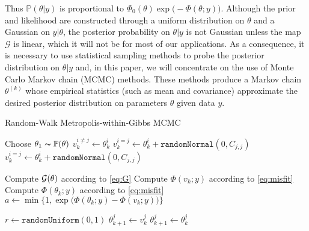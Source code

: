 \documentclass[10pt,letterpaper]{article}
\newcommand{\bbP}{\mathbb{P}}
\begin{document}
Thus $\bbP(\theta|y)$ is proportional to $\Phi_0(\theta)\exp\bigl(-\Phi(\theta;y)\bigr).$
Although the prior and likelihood are constructed through a uniform distribution on
$\theta$ and a Gaussian on $y|\theta$, the posterior probability on $\theta|y$
is not Gaussian unless the map ${\mathcal G}$ is linear, which it will not
be for most of our applications. As a consequence, it is necessary to use
statistical sampling methods to probe the posterior distribution
on $\theta|y$ and, in this paper, we will concentrate on the use of
Monte Carlo Markov chain (MCMC) methods. These methods produce
a Markov chain $\theta^{(k)}$ whose empirical statistics (such as
mean and covariance) approximate the desired posterior distribution
on parameters $\theta$ given data $y$. 

\begin{algorithm}
\caption{Random-Walk Metropolis-within-Gibbs MCMC}
\label{alg:MCMC}
\begin{algorithmic}[1]
	 
		\State Choose $\theta_1 \thicksim \bbP(\theta)$  
		 
			 
				\State $v_k^{i \not= j} \gets \theta_k^i$
				\State $v_k^{i=j} \gets \theta_k^i + \texttt{randomNormal}(0,C_{j,j})$ 	
				 
					\State $v_k^{i=j} \gets \theta_k^i + \texttt{randomNormal}(0,C_{j,j})$
				\EndWhile

				\State Compute ${\cal G}(\theta)$ according to \eqref{eq:G} 
				\State Compute $\Phi(v_k;y)$ according to \eqref{eq:misfit} 
				\State Compute $\Phi(\theta_k;y)$ according to \eqref{eq:misfit} 
				\State $a \gets \min\{1,\exp\bigl(\Phi(\theta_k;y)-\Phi(v_k;y)\bigr)\}$

				\State $r \gets \texttt{randomUniform}(0,1)$
					\State $\theta_{k+1}^j \gets v_k^j$ 
				\Else
					\State $\theta_{k+1}^j \gets \theta_{k}^j$ 
				\EndIf
			\EndFor
		\EndFor
	\EndFor
\EndProcedure
\end{algorithmic}
\end{algorithm}
\end{document}
